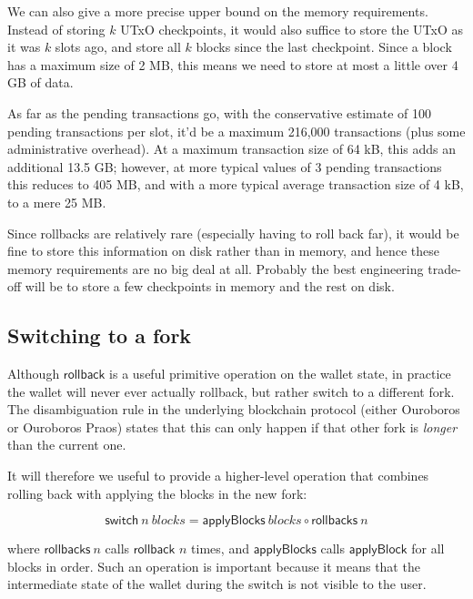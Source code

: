 \documentclass{article}
\numberwithin{equation}{lemma}
\begin{document}
We can also give a more precise upper bound on the memory requirements. Instead
of storing $k$ UTxO checkpoints, it would also suffice to store the UTxO as it
was $k$ slots ago, and store all $k$ blocks since the last checkpoint. Since a
block has a maximum size of 2 MB, this means we need to store at most a little
over 4 GB of data.

As far as the pending transactions go, with the conservative estimate of 100
pending transactions per slot, it'd be a maximum 216,000 transactions (plus some
administrative overhead). At a maximum transaction size of 64 kB, this adds an
additional 13.5 GB; however, at more typical values of 3 pending transactions
this reduces to 405 MB, and with a more typical average transaction size of 4
kB, to a mere 25 MB.

Since rollbacks are relatively rare (especially having to roll back far), it
would be fine to store this information on disk rather than in memory, and hence
these memory requirements are no big deal at all. Probably the best engineering
trade-off will be to store a few checkpoints in memory and the rest on disk.


\subsection{Switching to a fork}

Although $\mathsf{rollback}$ is a useful primitive operation on the wallet
state, in practice the wallet will never ever actually rollback, but rather
switch to a different fork. The disambiguation rule in the underlying blockchain
protocol (either Ouroboros or Ouroboros Praos) states that this can only happen
if that other fork is \emph{longer} than the current one.

It will therefore we useful to provide a higher-level operation that combines
rolling back with applying the blocks in the new fork:

\begin{equation}
\mathsf{switch} ~ n ~ \mathit{blocks} = \mathsf{applyBlocks} ~ \mathit{blocks} \circ \mathsf{rollbacks} ~ n
\end{equation}

where $\mathsf{rollbacks} ~ n$ calls $\mathsf{rollback}$ $n$ times, and
$\mathsf{applyBlocks}$ calls $\mathsf{applyBlock}$ for all blocks in order.
Such an operation is important because it means that the intermediate state
of the wallet during the switch is not visible to the user.
\end{document}
